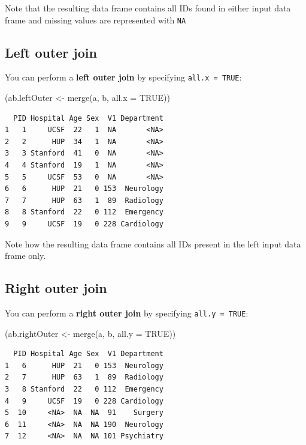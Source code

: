 \documentclass[
]{book}
\newenvironment{Shaded}{\begin{snugshade}}{\end{snugshade}}
\newcommand{\AttributeTok}[1]{\textcolor[rgb]{0.77,0.63,0.00}{#1}}
\newcommand{\ConstantTok}[1]{\textcolor[rgb]{0.00,0.00,0.00}{#1}}
\newcommand{\FunctionTok}[1]{\textcolor[rgb]{0.00,0.00,0.00}{#1}}
\newcommand{\NormalTok}[1]{#1}
\newcommand{\OtherTok}[1]{\textcolor[rgb]{0.56,0.35,0.01}{#1}}
\begin{document}
Note that the resulting data frame contains all IDs found in either input data frame and missing values are represented with \texttt{NA}

\hypertarget{left-outer-join}{%
\subsection{Left outer join}\label{left-outer-join}}

You can perform a \textbf{left outer join} by specifying \texttt{all.x\ =\ TRUE}:

\begin{Shaded}
\begin{Highlighting}[]
\NormalTok{(ab.leftOuter }\OtherTok{\textless{}{-}} \FunctionTok{merge}\NormalTok{(a, b, }\AttributeTok{all.x =} \ConstantTok{TRUE}\NormalTok{))}
\end{Highlighting}
\end{Shaded}

\begin{verbatim}
  PID Hospital Age Sex  V1 Department
1   1     UCSF  22   1  NA       <NA>
2   2      HUP  34   1  NA       <NA>
3   3 Stanford  41   0  NA       <NA>
4   4 Stanford  19   1  NA       <NA>
5   5     UCSF  53   0  NA       <NA>
6   6      HUP  21   0 153  Neurology
7   7      HUP  63   1  89  Radiology
8   8 Stanford  22   0 112  Emergency
9   9     UCSF  19   0 228 Cardiology
\end{verbatim}

Note how the resulting data frame contains all IDs present in the left input data frame only.

\hypertarget{right-outer-join}{%
\subsection{Right outer join}\label{right-outer-join}}

You can perform a \textbf{right outer join} by specifying \texttt{all.y\ =\ TRUE}:

\begin{Shaded}
\begin{Highlighting}[]
\NormalTok{(ab.rightOuter }\OtherTok{\textless{}{-}} \FunctionTok{merge}\NormalTok{(a, b, }\AttributeTok{all.y =} \ConstantTok{TRUE}\NormalTok{))}
\end{Highlighting}
\end{Shaded}

\begin{verbatim}
  PID Hospital Age Sex  V1 Department
1   6      HUP  21   0 153  Neurology
2   7      HUP  63   1  89  Radiology
3   8 Stanford  22   0 112  Emergency
4   9     UCSF  19   0 228 Cardiology
5  10     <NA>  NA  NA  91    Surgery
6  11     <NA>  NA  NA 190  Neurology
7  12     <NA>  NA  NA 101 Psychiatry
\end{verbatim}
\end{document}
